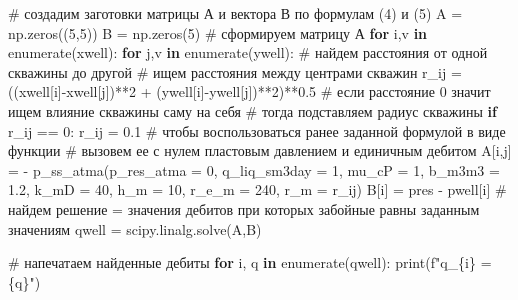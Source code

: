 \documentclass[
  russian,
  letterpaper,
  DIV=11,
  numbers=noendperiod,
  oneside]{scrartcl}
\newenvironment{Shaded}{\begin{snugshade}}{\end{snugshade}}
\newcommand{\BuiltInTok}[1]{\textcolor[rgb]{0.00,0.23,0.31}{#1}}
\newcommand{\CommentTok}[1]{\textcolor[rgb]{0.37,0.37,0.37}{#1}}
\newcommand{\ControlFlowTok}[1]{\textcolor[rgb]{0.00,0.23,0.31}{\textbf{#1}}}
\newcommand{\DecValTok}[1]{\textcolor[rgb]{0.68,0.00,0.00}{#1}}
\newcommand{\FloatTok}[1]{\textcolor[rgb]{0.68,0.00,0.00}{#1}}
\newcommand{\KeywordTok}[1]{\textcolor[rgb]{0.00,0.23,0.31}{\textbf{#1}}}
\newcommand{\NormalTok}[1]{\textcolor[rgb]{0.00,0.23,0.31}{#1}}
\newcommand{\OperatorTok}[1]{\textcolor[rgb]{0.37,0.37,0.37}{#1}}
\newcommand{\SpecialCharTok}[1]{\textcolor[rgb]{0.37,0.37,0.37}{#1}}
\newcommand{\SpecialStringTok}[1]{\textcolor[rgb]{0.13,0.47,0.30}{#1}}
\begin{document}
{\begin{footnotesize}
\begin{Shaded}
\begin{Highlighting}[]
\CommentTok{\# создадим заготовки матрицы А и вектора В по формулам (4) и (5)}
\NormalTok{A }\OperatorTok{=}\NormalTok{ np.zeros((}\DecValTok{5}\NormalTok{,}\DecValTok{5}\NormalTok{))}
\NormalTok{B }\OperatorTok{=}\NormalTok{ np.zeros(}\DecValTok{5}\NormalTok{)}
\CommentTok{\# сформируем матрицу А}
\ControlFlowTok{for}\NormalTok{ i,v }\KeywordTok{in} \BuiltInTok{enumerate}\NormalTok{(xwell):}
    \ControlFlowTok{for}\NormalTok{ j,v }\KeywordTok{in} \BuiltInTok{enumerate}\NormalTok{(ywell):}
        \CommentTok{\# найдем расстояния от одной скважины до другой}
        \CommentTok{\# ищем расстояния между центрами скважин}
\NormalTok{        r\_ij }\OperatorTok{=}\NormalTok{ ((xwell[i]}\OperatorTok{{-}}\NormalTok{xwell[j])}\OperatorTok{**}\DecValTok{2} \OperatorTok{+}\NormalTok{ (ywell[i]}\OperatorTok{{-}}\NormalTok{ywell[j])}\OperatorTok{**}\DecValTok{2}\NormalTok{)}\OperatorTok{**}\FloatTok{0.5}
        \CommentTok{\# если расстояние 0 значит ищем влияние скважины саму на себя}
        \CommentTok{\# тогда подставляем радиус скважины}
        \ControlFlowTok{if}\NormalTok{ r\_ij }\OperatorTok{==} \DecValTok{0}\NormalTok{:}
\NormalTok{            r\_ij }\OperatorTok{=} \FloatTok{0.1}
        \CommentTok{\# чтобы воспользоваться ранее заданной формулой в виде функции}
        \CommentTok{\# вызовем ее с нулем пластовым давлением и единичным дебитом}
\NormalTok{        A[i,j] }\OperatorTok{=} \OperatorTok{{-}}\NormalTok{ p\_ss\_atma(p\_res\_atma }\OperatorTok{=} \DecValTok{0}\NormalTok{,}
\NormalTok{                              q\_liq\_sm3day }\OperatorTok{=} \DecValTok{1}\NormalTok{,}
\NormalTok{                              mu\_cP }\OperatorTok{=} \DecValTok{1}\NormalTok{,}
\NormalTok{                              b\_m3m3 }\OperatorTok{=} \FloatTok{1.2}\NormalTok{,}
\NormalTok{                              k\_mD }\OperatorTok{=} \DecValTok{40}\NormalTok{,}
\NormalTok{                              h\_m }\OperatorTok{=} \DecValTok{10}\NormalTok{,}
\NormalTok{                              r\_e\_m }\OperatorTok{=} \DecValTok{240}\NormalTok{,}
\NormalTok{                              r\_m }\OperatorTok{=}\NormalTok{ r\_ij)}
\NormalTok{    B[i] }\OperatorTok{=}\NormalTok{ pres }\OperatorTok{{-}}\NormalTok{ pwell[i]}
\CommentTok{\# найдем решение = значения дебитов при которых забойные равны заданным значениям}
\NormalTok{qwell }\OperatorTok{=}\NormalTok{ scipy.linalg.solve(A,B)}

\CommentTok{\# напечатаем найденные дебиты}
\ControlFlowTok{for}\NormalTok{ i, q }\KeywordTok{in} \BuiltInTok{enumerate}\NormalTok{(qwell):}
    \BuiltInTok{print}\NormalTok{(}\SpecialStringTok{f"q\_}\SpecialCharTok{\{}\NormalTok{i}\SpecialCharTok{\}}\SpecialStringTok{ = }\SpecialCharTok{\{}\NormalTok{q}\SpecialCharTok{\}}\SpecialStringTok{"}\NormalTok{)}


\end{Highlighting}
\end{Shaded}
\end{footnotesize}}
\end{document}
